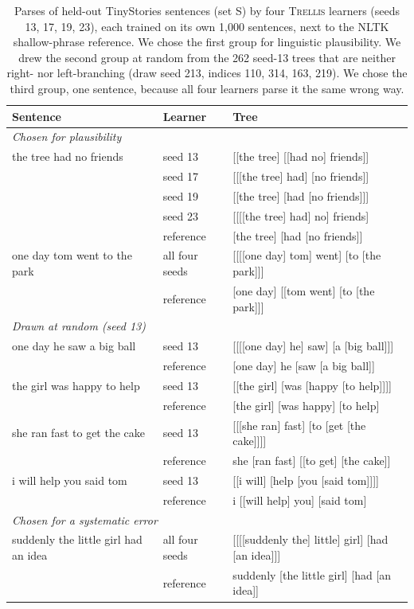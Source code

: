 \documentclass[11pt,letterpaper]{article}
\newcommand{\trellis}{\textsc{Trellis}}
\begin{document}
\begin{table}[!htbp]
\caption{Parses of held-out TinyStories sentences (set S) by four \trellis{} learners (seeds 13, 17, 19, 23), each trained on its own 1,000 sentences, next to the NLTK shallow-phrase reference.
We chose the first group for linguistic plausibility. We drew the second group at random from the 262 seed-13 trees that are neither right- nor left-branching (draw seed 213, indices 110, 314, 163, 219).
We chose the third group, one sentence, because all four learners parse it the same wrong way.}
\label{tab:cases}
\begin{center}
\footnotesize
\begin{tabular}{p{}p{}p{}}
\toprule
Sentence & Learner & Tree \\
\midrule
\multicolumn{3}{l}{\textit{Chosen for plausibility}} \\
the tree had no friends & seed 13 & [[the tree] [[had no] friends]] \\
 & seed 17 & [[[the tree] had] [no friends]] \\
 & seed 19 & [[the tree] [had [no friends]]] \\
 & seed 23 & [[[[the tree] had] no] friends] \\
 & reference & [the tree] [had [no friends]] \\
one day tom went to the park & all four seeds & [[[[one day] tom] went] [to [the park]]] \\
 & reference & [one day] [[tom went] [to [the park]]] \\
\midrule
\multicolumn{3}{l}{\textit{Drawn at random (seed 13)}} \\
one day he saw a big ball & seed 13 & [[[[one day] he] saw] [a [big ball]]] \\
 & reference & [one day] he [saw [a big ball]] \\
the girl was happy to help & seed 13 & [[the girl] [was [happy [to help]]]] \\
 & reference & [the girl] [was happy] [to help] \\
she ran fast to get the cake & seed 13 & [[[she ran] fast] [to [get [the cake]]]] \\
 & reference & she [ran fast] [[to get] [the cake]] \\
i will help you said tom & seed 13 & [[i will] [help [you [said tom]]]] \\
 & reference & i [[will help] you] [said tom] \\
\midrule
\multicolumn{3}{l}{\textit{Chosen for a systematic error}} \\
suddenly the little girl had an idea & all four seeds & [[[[suddenly the] little] girl] [had [an idea]]] \\
 & reference & suddenly [the little girl] [had [an idea]] \\
\bottomrule
\end{tabular}
\end{center}
\end{table}
\end{document}
